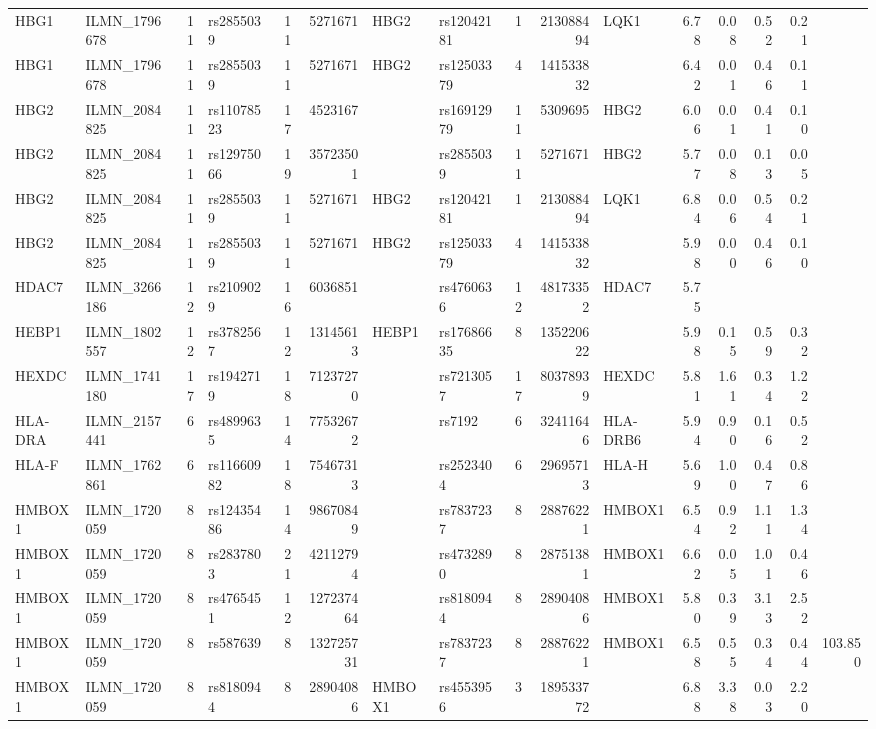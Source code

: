 \documentclass{article}
\begin{document}
\begin{landscape}
{\begin{ThreePartTable}
\begin{longtable}{|llr|lrrl|lrrl|rrrr|r|}
HBG1 & ILMN\_1796678 & 11 & rs2855039 & 11 & 5271671 & HBG2 & rs12042181 & 1 & 213088494 & LQK1 & 6.78 & 0.08 & 0.52 & 0.21 &  \\
HBG1 & ILMN\_1796678 & 11 & rs2855039 & 11 & 5271671 & HBG2 & rs12503379 & 4 & 141533832 &  & 6.42 & 0.01 & 0.46 & 0.11 &  \\
HBG2 & ILMN\_2084825 & 11 & rs11078523 & 17 & 4523167 &  & rs16912979 & 11 & 5309695 & HBG2 & 6.06 & 0.01 & 0.41 & 0.10 &  \\
HBG2 & ILMN\_2084825 & 11 & rs12975066 & 19 & 35723501 &  & rs2855039 & 11 & 5271671 & HBG2 & 5.77 & 0.08 & 0.13 & 0.05 &  \\
HBG2 & ILMN\_2084825 & 11 & rs2855039 & 11 & 5271671 & HBG2 & rs12042181 & 1 & 213088494 & LQK1 & 6.84 & 0.06 & 0.54 & 0.21 &  \\
HBG2 & ILMN\_2084825 & 11 & rs2855039 & 11 & 5271671 & HBG2 & rs12503379 & 4 & 141533832 &  & 5.98 & 0.00 & 0.46 & 0.10 &  \\
HDAC7 & ILMN\_3266186 & 12 & rs2109029 & 16 & 6036851 &  & rs4760636 & 12 & 48173352 & HDAC7 & 5.75 &  &  &  &  \\
HEBP1 & ILMN\_1802557 & 12 & rs3782567 & 12 & 13145613 & HEBP1 & rs17686635 & 8 & 135220622 &  & 5.98 & 0.15 & 0.59 & 0.32 &  \\
HEXDC & ILMN\_1741180 & 17 & rs1942719 & 18 & 71237270 &  & rs7213057 & 17 & 80378939 & HEXDC & 5.81 & 1.61 & 0.34 & 1.22 &  \\
HLA-DRA & ILMN\_2157441 & 6 & rs4899635 & 14 & 77532672 &  & rs7192 & 6 & 32411646 & HLA-DRB6 & 5.94 & 0.90 & 0.16 & 0.52 &  \\
HLA-F & ILMN\_1762861 & 6 & rs11660982 & 18 & 75467313 &  & rs2523404 & 6 & 29695713 & HLA-H & 5.69 & 1.00 & 0.47 & 0.86 &  \\
HMBOX1 & ILMN\_1720059 & 8 & rs12435486 & 14 & 98670849 &  & rs7837237 & 8 & 28876221 & HMBOX1 & 6.54 & 0.92 & 1.11 & 1.34 &  \\
HMBOX1 & ILMN\_1720059 & 8 & rs2837803 & 21 & 42112794 &  & rs4732890 & 8 & 28751381 & HMBOX1 & 6.62 & 0.05 & 1.01 & 0.46 &  \\
HMBOX1 & ILMN\_1720059 & 8 & rs4765451 & 12 & 127237464 &  & rs8180944 & 8 & 28904086 & HMBOX1 & 5.80 & 0.39 & 3.13 & 2.52 &  \\
HMBOX1 & ILMN\_1720059 & 8 & rs587639 & 8 & 132725731 &  & rs7837237 & 8 & 28876221 & HMBOX1 & 6.58 & 0.55 & 0.34 & 0.44 & 103.850 \\
HMBOX1 & ILMN\_1720059 & 8 & rs8180944 & 8 & 28904086 & HMBOX1 & rs4553956 & 3 & 189533772 &  & 6.88 & 3.38 & 0.03 & 2.20 &  \\

\end{longtable}
\end{ThreePartTable}}
\end{landscape}
\end{document}
